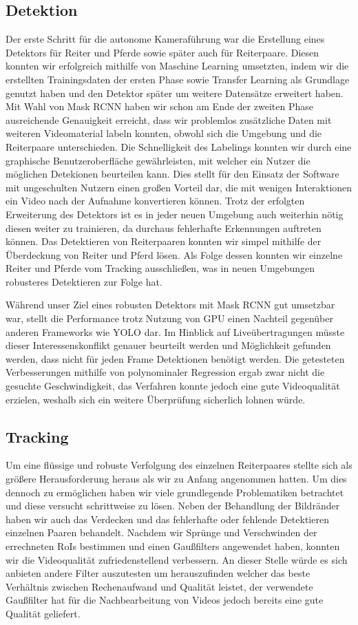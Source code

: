\subsection*{ Detektion}
Der erste Schritt für die autonome Kameraführung war die Erstellung eines Detektors für Reiter und Pferde sowie später auch für Reiterpaare. Diesen konnten wir erfolgreich mithilfe von Maschine Learning umsetzten, indem wir die erstellten Trainingsdaten der ersten Phase sowie Transfer Learning als Grundlage genutzt haben und den Detektor später um weitere Datensätze erweitert haben. Mit Wahl von Mask RCNN haben wir schon am Ende der zweiten Phase ausreichende Genauigkeit erreicht, dass wir problemlos zusätzliche Daten mit weiteren Videomaterial labeln konnten, obwohl sich die Umgebung und die Reiterpaare unterschieden. Die Schnelligkeit des Labelings konnten wir durch eine graphische Benutzeroberfläche gewährleisten, mit welcher ein Nutzer die möglichen Detekionen beurteilen kann. Dies stellt für den Einsatz der Software mit ungeschulten Nutzern einen großen Vorteil dar, die mit wenigen Interaktionen ein Video nach der Aufnahme konvertieren können. Trotz der erfolgten Erweiterung des Detektors ist es in jeder neuen Umgebung auch weiterhin nötig diesen weiter zu trainieren, da durchaus fehlerhafte Erkennungen auftreten können.
Das Detektieren von Reiterpaaren konnten wir simpel mithilfe der Überdeckung von Reiter und Pferd lösen. Als Folge dessen konnten wir einzelne Reiter und Pferde vom Tracking ausschließen, was in neuen Umgebungen robusteres Detektieren zur Folge hat.

Während unser Ziel eines robusten Detektors mit Mask RCNN gut umsetzbar war, stellt die Performance trotz Nutzung von GPU einen Nachteil gegenüber anderen Frameworks wie YOLO dar. Im Hinblick auf Liveübertragungen müsste dieser Interessenskonflikt genauer beurteilt werden und Möglichkeit gefunden werden, dass nicht für jeden Frame Detektionen benötigt werden. Die getesteten Verbesserungen mithilfe von polynominaler Regression ergab zwar nicht die gesuchte Geschwindigkeit, das Verfahren konnte jedoch eine gute Videoqualität erzielen, weshalb sich ein weitere Überprüfung sicherlich lohnen würde.


\subsection*{ Tracking}
Um eine flüssige und robuste Verfolgung des einzelnen Reiterpaares stellte sich als größere Herausforderung heraus als wir zu Anfang angenommen hatten. Um dies dennoch zu ermöglichen haben wir viele grundlegende Problematiken betrachtet und diese versucht schrittweise zu lösen. 
Neben der Behandlung der Bildränder haben wir auch das Verdecken und das fehlerhafte oder fehlende Detektieren einzelnen Paaren behandelt. Nachdem wir Sprünge und Verschwinden der errechneten RoIs bestimmen und einen Gaußfilters angewendet haben, konnten wir die Videoqualität zufriedenstellend verbessern. An dieser Stelle würde es sich anbieten andere Filter auszutesten um herauszufinden welcher das beste Verhältnis zwischen Rechenaufwand und Qualität leistet, der verwendete Gaußfilter hat für die Nachbearbeitung von Videos jedoch bereits eine gute Qualität geliefert.

